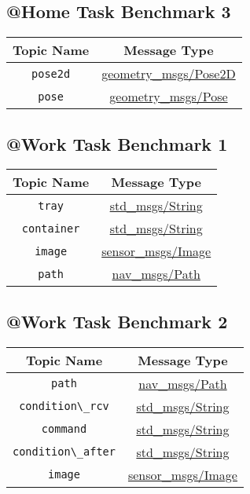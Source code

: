\documentclass[a4paper]{article}
\begin{document}
\subsection{@Home Task Benchmark 3}
\begin{center}
\begin{tabular}{|c|c|}\hline
Topic Name & Message Type \\\hline\hline
\verb!pose2d! & \href{http://docs.ros.org/api/geometry\_msgs/html/msg/Pose2D.html}{geometry\_msgs/Pose2D} \\\hline
\verb!pose! & \href{http://docs.ros.org/api/geometry\_msgs/html/msg/Pose.html}{geometry\_msgs/Pose} \\\hline
\end{tabular}
\end{center}


\subsection{@Work Task Benchmark 1}
\begin{center}
\begin{tabular}{|c|c|}\hline
Topic Name & Message Type \\\hline\hline
\verb!tray! & \href{http://docs.ros.org/api/std\_msgs/html/msg/String.html}{std\_msgs/String} \\\hline
\verb!container! & \href{http://docs.ros.org/api/std\_msgs/html/msg/String.html}{std\_msgs/String} \\\hline
\verb!image! & \href{http://docs.ros.org/api/sensor\_msgs/html/msg/Image.html}{sensor\_msgs/Image} \\\hline
\verb!path! & \href{http://docs.ros.org/api/nav\_msgs/html/msg/Path.html}{nav\_msgs/Path} \\\hline
\end{tabular}
\end{center}


\subsection{@Work Task Benchmark 2}
\begin{center}
\begin{tabular}{|c|c|}\hline
Topic Name & Message Type \\\hline\hline
\verb!path! & \href{http://docs.ros.org/api/nav\_msgs/html/msg/Path.html}{nav\_msgs/Path} \\\hline
\verb!condition\_rcv! & \href{http://docs.ros.org/api/std\_msgs/html/msg/String.html}{std\_msgs/String} \\\hline
\verb!command! & \href{http://docs.ros.org/api/std\_msgs/html/msg/String.html}{std\_msgs/String} \\\hline
\verb!condition\_after! & \href{http://docs.ros.org/api/std\_msgs/html/msg/String.html}{std\_msgs/String} \\\hline
\verb!image! & \href{http://docs.ros.org/api/sensor\_msgs/html/msg/Image.html}{sensor\_msgs/Image} \\\hline
\end{tabular}
\end{center}
\end{document}
